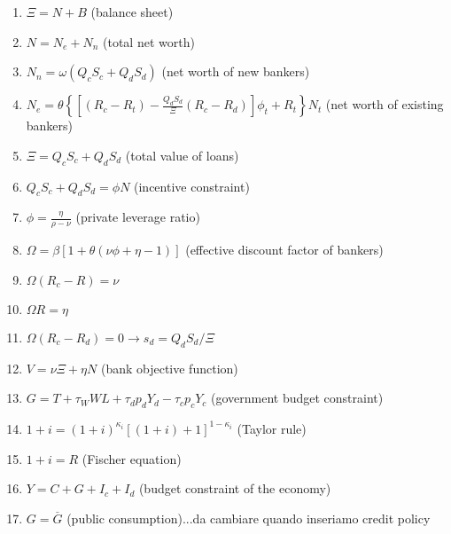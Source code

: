 \documentclass{article}
\begin{document}
\begin{enumerate}
\item $\Xi =N+B$ (balance sheet)

\item $N=N_{e}+N_{n}$ (total net worth)

\item $N_{n}=\omega (Q_{c}S_{c}+Q_{d}S_{d})$ (net worth of new bankers)

\item $N_{e}=\theta \left\{ \left[ (R_{c}-R_{t})-\frac{Q_{d}S_{d}}{\Xi }%
(R_{c}-R_{d})\right] \phi _{t}+R_{t}\right\} N_{t}$ (net worth of existing
bankers)

\item $\Xi =Q_{c}S_{c}+Q_{d}S_{d}$ (total value of loans)

\item $Q_{c}S_{c}+Q_{d}S_{d}=\phi N$ (incentive constraint)

\item $\phi =\frac{\eta }{\rho -\nu }$ (private leverage ratio)

\item $\Omega =\beta \left[ 1+\theta (\nu \phi +\eta -1)\right] $ (effective
discount factor of bankers)

\item $\Omega (R_{c}-R)=\nu $

\item $\Omega R=\eta $

\item $\Omega (R_{c}-R_{d})=0\rightarrow s_{d}=Q_{d}S_{d}/\Xi $ \ \ \ 

\item $V=\nu \Xi +\eta N$ (bank objective function)

\item $G=T+\tau _{W}WL+\tau _{d}p_{d}Y_{d}-\tau _{c}p_{c}Y_{c}$ (government
budget constraint)

\item $1+i=(1+i)^{\kappa _{i}}\left[ (1+i)+1\right] ^{1-\kappa _{i}}$
(Taylor rule)

\item $1+i=R$ (Fischer equation)

\item $Y=C+G+I_{c}+I_{d}$ (budget constraint of the economy)

\item $G=\overset{\_}{G}$ (public consumption)...da cambiare quando
inseriamo credit policy
\end{enumerate}
\end{document}
